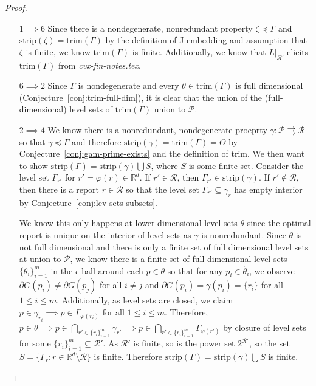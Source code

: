 \documentclass[12pt]{article}
\newcommand{\Comments}{1}
\newcommand{\mynote}[2]{\ifnum\Comments=1\textcolor{#1}{#2}\fi}
\newcommand{\jessie}[1]{\mynote{purple}{[JF: #1]}}
\newcommand{\reals}{\mathbb{R}}
\renewcommand{\P}{\mathcal{P}}
\newcommand{\R}{\mathcal{R}}
\newcommand{\inter}[1]{\mathring{#1}}%
\newcommand{\toto}{\rightrightarrows}
\newcommand{\trim}{\mathrm{trim}}
\newcommand{\strip}{\mathrm{strip}}
\begin{document}
\begin{proof}
\begin{enumerate}
\item [$1 \implies 6$]
Since there is a nondegenerate, nonredundant property $\zeta \preceq \Gamma$ and $\strip(\zeta) = \trim(\Gamma)$ by the definition of J-embedding and assumption that $\zeta$ is finite, we know $\trim(\Gamma)$ is finite.
Additionally, we know that $L|_{\R'}$ elicits $\trim(\Gamma)$ from \emph{cvx-fin-notes.tex}.

\item [$6 \implies 2$]
Since $\Gamma$ is nondegenerate and every $\theta \in \trim(\Gamma)$ is full dimensional (Conjecture~\ref{conj:trim-full-dim}), it is clear that the union of the (full-dimensional) level sets of $\trim(\Gamma)$ union to $\P$.


\item [$2 \implies 4$]
	We know there is a nonredundant, nondegenerate proeprty $\gamma : \P \toto \R$ so that $\gamma \preceq \Gamma$ and therefore $\strip(\gamma) = \trim(\Gamma) = \Theta$ by Conjecture~\ref{conj:gam-prime-exists} and the definition of trim.
	We then want to show $\strip(\Gamma) = \strip(\gamma) \bigcup S$, where $S$ is some finite set.
	Consider the level set $\Gamma_{r'}$ for $r' = \varphi(r) \in \reals^d$.
	If $r' \in \R$, then $\Gamma_{r'} \in \strip(\gamma)$.
	If $r' \not \in \R$, then there is a report $r \in \R$ so that the level set $\Gamma_{r'} \subseteq \gamma_r$ has empty interior by Conjecture~\ref{conj:lev-sets-subsets}.
			
	We know this only happens at lower dimensional level sets $\theta$ since the optimal report is unique on the interior of level sets as $\gamma$ is nonredundant.
	Since $\theta$ is not full dimensional and there is only a finite set of full dimensional level sets at union to $\P$, we know there is a finite set of full dimensional level sets $\{\theta_i\}_{i=1}^m$ in the $\epsilon$-ball around each $p \in \theta$ so that for any $p_i \in \inter{\theta_i}$, we observe $\partial G(p_i) \neq \partial G(p_j)$ for all $i \neq j$ and $\partial G(p_i) = \gamma(p_i) = \{r_i\}$ for all $1 \leq i \leq m$.
	Additionally, as level sets are closed, we claim $p \in \gamma_{r_i} \implies p \in \Gamma_{\varphi(r_i)}$ for all $1 \leq i \leq m$.
	Therefore, $p \in \theta \implies p \in \bigcap_{r' \in \{r_i\}_{i=1}^m} \gamma_{r'}\implies p \in \bigcap_{r' \in \{r_i\}_{i=1}^m} \Gamma_{\varphi(r')}$ by closure of level sets for some $\{r_i\}_{i=1}^m \subseteq \R'$.
	As $\R'$ is finite, so is the power set $2^{\R'}$, so the set $S = \{\Gamma_r : r \in \reals^d \setminus \R \}$ is finite.
	Therefore $\strip(\Gamma) = \strip(\gamma) \bigcup S$ is finite. 
		


\end{enumerate}
\end{proof}
\end{document}
